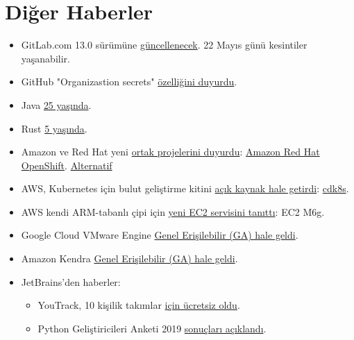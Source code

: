 \documentclass[11pt]{article}
\begin{document}
\section{Diğer Haberler}
\label{sec:orgd165855}
\begin{itemize}
\item GitLab.com 13.0 sürümüne \href{https://about.gitlab.com/releases/2020/05/06/gitlab-com-13-0-breaking-changes/}{güncellenecek}. 22 Mayıs günü kesintiler
yaşanabilir.
\item GitHub "Organizastion secrets" \href{https://github.blog/changelog/2020-05-14-organization-secrets/}{özelliğini duyurdu}.
\item Java \href{https://blogs.oracle.com/java/our-world-moved-by-java}{25 yaşında}.
\item Rust \href{https://blog.rust-lang.org/2020/05/15/five-years-of-rust.html}{5 yaşında}.
\item Amazon ve Red Hat yeni \href{https://www.zdnet.com/article/amazon-red-hat-openshift-announced-for-public-cloud-kubernetes-users/}{ortak projelerini duyurdu}: \href{https://aws.amazon.com/quickstart/architecture/openshift/}{Amazon Red Hat OpenShift}.
\href{https://www.redhat.com/en/blog/red-hat-and-aws-extend-collaboration-introducing-amazon-red-hat-openshift}{Alternatif}
\item AWS, Kubernetes için bulut geliştirme kitini \href{https://siliconangle.com/2020/05/13/aws-open-sources-cdk8s-make-kubernetes-easier-use/}{açık kaynak hale getirdi}:
\href{https://siliconangle.com/2020/05/13/aws-open-sources-cdk8s-make-kubernetes-easier-use/}{cdk8s}.
\item AWS kendi ARM-tabanlı çipi için \href{https://aws.amazon.com/blogs/aws/new-m6g-ec2-instances-powered-by-arm-based-aws-graviton2/}{yeni EC2 servisini tanıttı}: EC2 M6g.
\item Google Cloud VMware Engine \href{https://cloud.google.com/blog/topics/hybrid-cloud/announcing-google-cloud-vmware-engine}{Genel Erişilebilir (GA) hale geldi}.
\item Amazon Kendra \href{https://techcrunch.com/2020/05/11/amazon-releases-kendra-to-solve-enterprise-search-with-ai-and-machine-learning/}{Genel Erişilebilir (GA) hale geldi}.
\item JetBrains'den haberler:
\begin{itemize}
\item YouTrack, 10 kişilik takımlar \href{https://blog.jetbrains.com/youtrack/2020/05/youtrack-is-now-free-for-10/}{için ücretsiz oldu}.
\item Python Geliştiricileri Anketi 2019 \href{https://www.jetbrains.com/lp/python-developers-survey-2019}{sonuçları açıklandı}.

\end{itemize}
\end{itemize}
\end{document}
